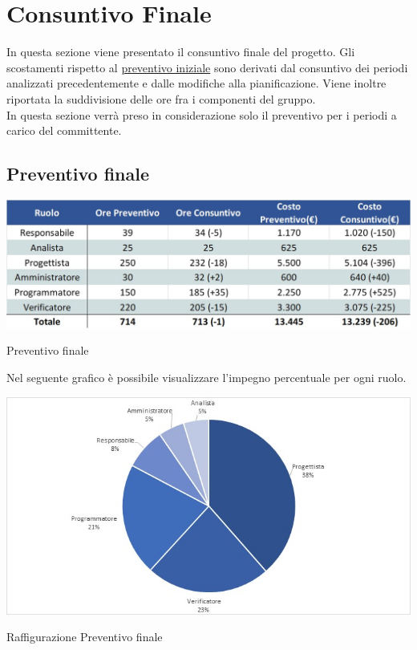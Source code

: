 \newpage
\section{Consuntivo Finale} \label{Consuntivo Finale}

In questa sezione viene presentato il consuntivo finale del progetto. Gli scostamenti rispetto al \hyperref[Preventivo]{preventivo iniziale} sono derivati dal consuntivo dei periodi analizzati precedentemente e dalle modifiche alla pianificazione. Viene inoltre riportata la suddivisione delle ore fra i componenti del gruppo. \\
In questa sezione verrà preso in considerazione solo il preventivo per i periodi a carico del committente.

\subsection{Preventivo finale}
\begin{table}[h!]
	\centerline{\includegraphics[scale=0.60]{img/Preventivo/Consuntivo/PreventivoFinire.jpg}}
	\caption{Preventivo finale}
\end{table}

Nel seguente grafico è possibile visualizzare l'impegno percentuale per ogni ruolo.

\begin{table}[h!]
	\centerline{\includegraphics[scale=0.70]{img/Preventivo/Torte/PreventivoFinire.jpg}}
	\caption{Raffigurazione Preventivo finale}
\end{table}

